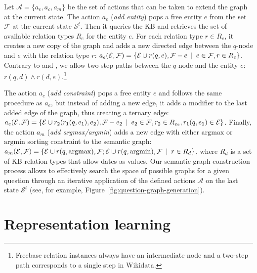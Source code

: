 \documentclass[11pt]{article}
\begin{document}
Let $\mathcal{A} = \{a_e, a_c, a_m\}$ be the set of actions that can be taken to extend the graph at the current state. The action $a_e$ (\textit{add entity}) pops a free entity $e$ from the set $\mathcal{F}$ at the current state $\mathcal{S}^t$. Then it queries the KB and retrieves the set of available relation types $R_e$ for the entity $e$. For each relation type $r \in R_e$, it creates a new copy of the graph and adds a new directed edge between the $q$-node and $e$ with the relation type $r$:  $a_e(\mathcal{E}, \mathcal{F})= 
\{ \mathcal{E} \cup r(q,e), \mathcal{F} - e \hspace{0.5em}|\hspace{0.5em}e\in \mathcal{F}, r \in R_e\}$. Contrary to  and , we allow two-step paths between the $q$-node and the entity $e$: $r(q,d) \land r(d, e)$.\footnote{Freebase relation instances always have an intermediate node and a two-step path corresponds to a single step in Wikidata.}

The action $a_c$ (\textit{add constraint}) pops a free entity $e$ and follows the same procedure as $a_e$, but instead of adding a new edge, it adds a modifier to the last added edge of the graph, thus creating a ternary edge: $a_c(\mathcal{E}, \mathcal{F})= 
\{ \mathcal{E} \cup r_2(r_1(q, e_1), e_2), \mathcal{F} - e_2\hspace{0.5em}|\hspace{0.5em}e_2\in \mathcal{F}, r_2 \in R_{e_2}, r_1(q, e_1) \in \mathcal{E} \}$. Finally, the action $a_m$ (\textit{add argmax/argmin}) adds a new edge with either $\mathrm{argmax}$ or $\mathrm{argmin}$ sorting constraint to the semantic graph: $a_m(\mathcal{E}, \mathcal{F})= 
\{ \mathcal{E} \cup r(q, \mathrm{argmax}), \mathcal{F}; \mathcal{E} \cup r(q, \mathrm{argmin}), \mathcal{F}\hspace{0.5em}|\hspace{0.5em}r \in R_d \}$, where $R_d$ is a set of KB relation types that allow dates as values. Our semantic graph construction process allows to effectively search the space of possible graphs for a given question through an iterative application of the defined actions $\mathcal{A}$ on the last state $\mathcal{S}^{t}$ (see, for example, Figure~\ref{fig:question-graph-generation}). 


\section{Representation learning}
\end{document}
